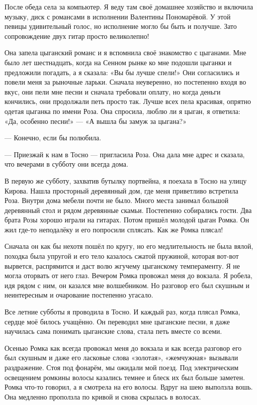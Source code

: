 После обеда села за компьютер.
Я веду там своё домашнее хозяйство и включила музыку, диск с романсами в исполнении Валентины Пономарёвой.
У этой певицы удивительный голос, но исполнение могло бы быть и получше.
Зато сопровождение двух гитар просто великолепно!

Она запела цыганский романс и я вспомнила своё знакомство с цыганами.
Мне было лет шестнадцать, когда на Сенном рынке ко мне подошли цыганки и предложили погадать, а я сказала: 
«Вы бы лучше спели!» 
Они согласились и повели меня за рыночные ларьки.
Сначала неуверенно, но постепенно входя во вкус, они пели мне песни и сначала требовали оплату, но когда деньги кончились, они продолжали петь просто так.
Лучше всех пела красивая, опрятно одетая цыганка по имени Роза.
Она спросила, люблю ли я цыган, я ответила: «Да, особенно песни!» --- «А вышла бы замуж за цыгана?»

--- Конечно, если бы полюбила.

--- Приезжай к нам в Тосно --- пригласила Роза.
Она дала мне адрес и сказала, что вечерами в субботу они всегда дома.

В первую же субботу, захватив бутылку портвейна, я поехала в Тосно на улицу Кирова.
Нашла просторный деревянный дом, где меня приветливо встретила Роза.
Внутри дома мебели почти не было.
Много места занимал большой деревянный стол и рядом деревянные скамьи.
Постепенно собирались гости.
Два брата Розы хорошо играли на гитарах.
Потом пришёл молодой цыган Ромка.
Он жил где-то неподалёку и его попросили сплясать.
Как же Ромка плясал!

Сначала он как бы нехотя пошёл по кругу, но его медлительность не была вялой, походка была упругой и его тело казалось сжатой пружиной, которая вот-вот вырвется, распрямится и даст волю жгучему цыганскому темпераменту.
Я не могла оторвать от него глаз.
Вечером Ромка провожал меня до вокзала.
Я робела, идя рядом с ним, он казался мне волшебником.
Но разговор его был скушным и неинтересным и очарование постепенно угасало.

Все летние субботы я проводила в Тосно.
И каждый раз, когда плясал Ромка, сердце моё билось учащённо.
Он переводил мне цыганские песни, я даже научилась сама понимать цыганские слова, стала петь вместе со всеми.

Осенью Ромка как всегда провожал меня до вокзала и как всегда разговор его был скушным и даже его ласковые слова «золотая», «жемчужная» вызывали раздражение.
Стоя под фонарём, мы ожидали мой поезд.
Под электрическим освещением ромкины волосы казались темнее и блеск их был больше заметен.
Ромка что-то говорил, а я смотрела на его волосы.
Вдруг на шею выползла вошь.
Она медленно проползла по кривой и снова скрылась в волосах.

